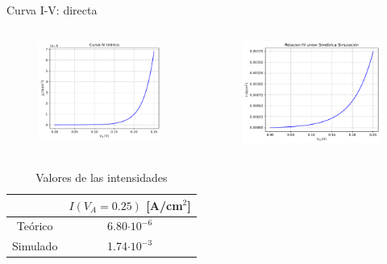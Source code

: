 \documentclass[aspectratio=169,xcolor=dvipsnames]{beamer}
\begin{document}
\begin{frame}{Curva I-V: directa}
    \begin{columns}
        \begin{column}{0.5\textwidth}
            \begin{figure}
                \includegraphics[width=0.90\linewidth]{Teorico/Intensidades-Directa.pdf}
            \end{figure}
        \end{column}
        \begin{column}{0.5\textwidth}
            \begin{figure}
                \includegraphics[width=0.90\linewidth]{Directa/Intensidades-Directa.pdf}
            \end{figure}
        \end{column}
        \end{columns}
        \begin{table}
            \caption{Valores de las intensidades}
            \begin{tabular}{c|c}
                  & $I(V_A=0.25)$ \tiny{[A/cm$^2$]}  \\ \hline
                Teórico & 6.80$\cdot 10^{-6}$ \\
                Simulado & 1.74$\cdot 10^{-3}$
            \end{tabular}
        \end{table}
\end{frame}
\end{document}

